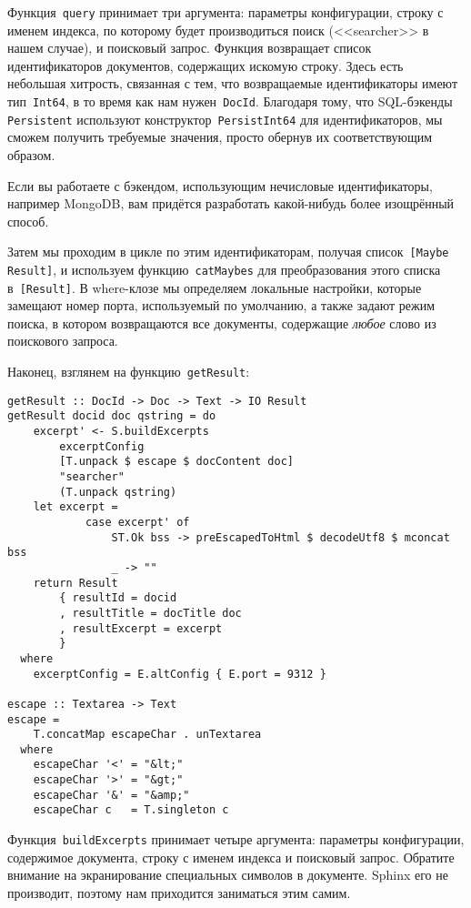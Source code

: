 Функция~\lstinline'query' принимает три аргумента: параметры конфигурации, строку с именем индекса, по которому будет производиться поиск (<<searcher>> в нашем случае), и поисковый запрос. Функция возвращает список идентификаторов документов, содержащих искомую строку. Здесь есть небольшая хитрость, связанная с тем, что возвращаемые идентификаторы имеют тип~\lstinline'Int64', в то время как нам нужен~\lstinline'DocId'. Благодаря тому, что SQL-бэкенды \lstinline'Persistent' используют конструктор~\lstinline'PersistInt64' для идентификаторов, мы сможем получить требуемые значения, просто обернув их соответствующим образом.

\begin{remark}
Если вы работаете с бэкендом, использующим нечисловые идентификаторы, например MongoDB, вам придётся разработать какой-нибудь более изощрённый способ.
\end{remark}

Затем мы проходим в цикле по этим идентификаторам, получая список~\lstinline'[Maybe Result]', и используем функцию~\lstinline'catMaybes' для преобразования этого списка в~\lstinline'[Result]'. В where-клозе мы определяем локальные настройки, которые замещают номер порта, используемый по умолчанию, а также задают режим поиска, в котором возвращаются все документы, содержащие \emph{любое} слово из поискового запроса.

Наконец, взглянем на функцию~\lstinline'getResult':
\begin{lstlisting}
getResult :: DocId -> Doc -> Text -> IO Result
getResult docid doc qstring = do
    excerpt' <- S.buildExcerpts
        excerptConfig
        [T.unpack $ escape $ docContent doc]
        "searcher"
        (T.unpack qstring)
    let excerpt =
            case excerpt' of
                ST.Ok bss -> preEscapedToHtml $ decodeUtf8 $ mconcat bss
                _ -> ""
    return Result
        { resultId = docid
        , resultTitle = docTitle doc
        , resultExcerpt = excerpt
        }
  where
    excerptConfig = E.altConfig { E.port = 9312 }

escape :: Textarea -> Text
escape =
    T.concatMap escapeChar . unTextarea
  where
    escapeChar '<' = "&lt;"
    escapeChar '>' = "&gt;"
    escapeChar '&' = "&amp;"
    escapeChar c   = T.singleton c
\end{lstlisting}

Функция~\lstinline'buildExcerpts' принимает четыре аргумента: параметры конфигурации, содержимое документа, строку с именем индекса и поисковый запрос. Обратите внимание на экранирование специальных символов в документе. Sphinx его не производит, поэтому нам приходится заниматься этим самим.

